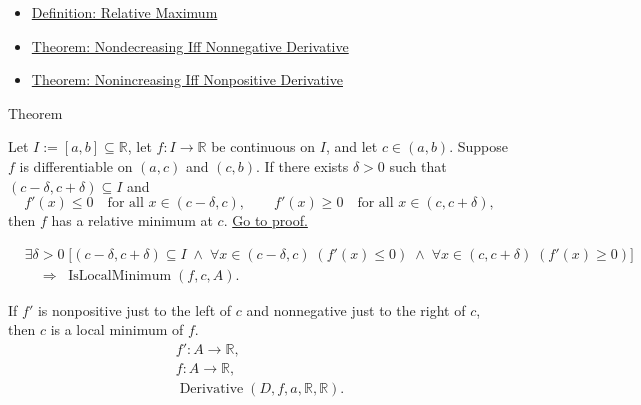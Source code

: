 \begin{dependencies}
\begin{itemize}
  \item \hyperref[def:relative-maximum]{Definition: Relative Maximum}
  \item \hyperref[thm:nondecreasing-iff-nonneg-derivative]{Theorem: Nondecreasing Iff Nonnegative Derivative}
  \item \hyperref[thm:nonincreasing-iff-nonpos-derivative]{Theorem: Nonincreasing Iff Nonpositive Derivative}
\end{itemize}
\end{dependencies}


\begin{theorembox}{Theorem}
\begin{theorem}
\label{thm:first-derivative-test-minimum}
Let $I := [a,b] \subseteq \mathbb{R}$, let $f : I \to \mathbb{R}$ be continuous on $I$, and let $c \in (a,b)$. Suppose $f$ is differentiable on $(a,c)$ and $(c,b)$. If there exists $\delta > 0$ such that $(c-\delta,c+\delta) \subseteq I$ and
\[
f'(x) \leq 0 \quad \text{for all } x \in (c-\delta,c),
\qquad
f'(x) \geq 0 \quad \text{for all } x \in (c,c+\delta),
\]
then $f$ has a relative minimum at $c$.
\hyperref[prf:first-derivative-test-minimum]{Go to proof.}
\end{theorem}
\end{theorembox}

\begin{remark*}
\begin{align*}
&\exists \delta > 0\;\bigl[(c-\delta,c+\delta)\subseteq I
\;\land\;
\forall x\in(c-\delta,c)\;(f'(x)\leq 0)
\;\land\;
\forall x\in(c,c+\delta)\;(f'(x)\geq 0)\bigr]\\
&\quad\Rightarrow\; \operatorname{IsLocalMinimum}(f,c,A).
\end{align*}
\end{remark*}

\begin{remark*}
If $f'$ is nonpositive just to the left of $c$ and nonnegative just to the
right of $c$, then $c$ is a local minimum of $f$.
\[
\begin{aligned}
  f'\colon A\to\mathbb{R},\\
  f\colon A\to\mathbb{R},\\
  \operatorname{Derivative}(D,f,a,\mathbb{R},\mathbb{R}).
\end{aligned}
\]
\end{remark*}

